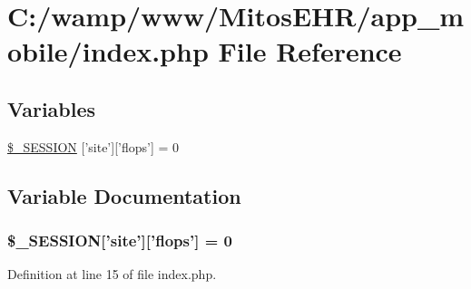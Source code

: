 \hypertarget{app__mobile_2index_8php}{\section{\-C\-:/wamp/www/\-Mitos\-E\-H\-R/app\-\_\-mobile/index.php \-File \-Reference}
\label{app__mobile_2index_8php}
}
\subsection*{\-Variables}
\begin{DoxyCompactItemize}
\item 
\hyperlink{app__mobile_2index_8php_a99fda8552a3e58235643b79f5af3ded8}{\$\-\_\-\-S\-E\-S\-S\-I\-O\-N} \mbox{[}'site'\mbox{]}\mbox{[}'flops'\mbox{]} = 0
\end{DoxyCompactItemize}


\subsection{\-Variable \-Documentation}
\hypertarget{app__mobile_2index_8php_a99fda8552a3e58235643b79f5af3ded8}{
\subsubsection[{\$\-\_\-\-S\-E\-S\-S\-I\-O\-N}]{\setlength{\rightskip}{0pt plus 5cm}\$\-\_\-\-S\-E\-S\-S\-I\-O\-N\mbox{[}'site'\mbox{]}\mbox{[}'flops'\mbox{]} = 0}}\label{app__mobile_2index_8php_a99fda8552a3e58235643b79f5af3ded8}


\-Definition at line 15 of file index.\-php.


